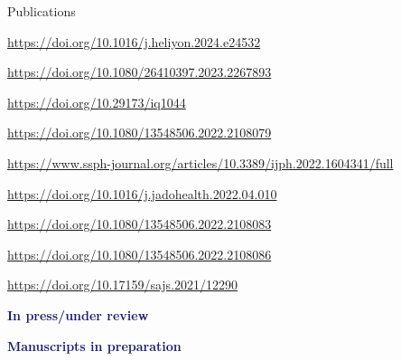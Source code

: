 \begin{rSection}{Publications}

\begin{etaremune}
\item {} \url{https://doi.org/10.1016/j.heliyon.2024.e24532}
\item {} \url{https://doi.org/10.1080/26410397.2023.2267893}
\item {} \url{https://doi.org/10.29173/iq1044}
\item {} \url{https://doi.org/10.1080/13548506.2022.2108079}
\item {} \url{https://www.ssph-journal.org/articles/10.3389/ijph.2022.1604341/full}
\item {} \url{https://doi.org/10.1016/j.jadohealth.2022.04.010}
\item {} \url{https://doi.org/10.1080/13548506.2022.2108083}
\item {} \url{https://doi.org/10.1080/13548506.2022.2108086}
\item {} \url{https://doi.org/10.17159/sajs.2021/12290}
\end{etaremune}

\vspace{1em}
\textcolor{MidnightBlue}{\textbf{In press/under review}}
\vspace{1em}

\begin{etaremune}
\item {}
\item {}
\item {}
\end{etaremune}

\vspace{1em}
\textcolor{MidnightBlue}{\textbf{Manuscripts in preparation}}
\vspace{1em}

\begin{etaremune}
\item {}
\item {}
\item {}
\item {}
\end{etaremune}


\end{rSection}
